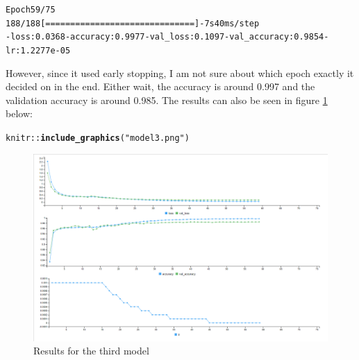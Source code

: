 \documentclass[10pt, a4paper, english]{article}\usepackage[]{graphicx}\usepackage[dvipsnames]{xcolor}
\makeatletter
\def\maxwidth{ %
  \ifdim\Gin@nat@width>\linewidth
    \linewidth
  \else
    \Gin@nat@width
  \fi
}
\newcommand{\hlstr}[1]{\textcolor[rgb]{0.192,0.494,0.8}{#1}}%
\newcommand{\hlopt}[1]{\textcolor[rgb]{0,0,0}{#1}}%
\newcommand{\hlstd}[1]{\textcolor[rgb]{0.345,0.345,0.345}{#1}}%
\newcommand{\hlkwd}[1]{\textcolor[rgb]{0.737,0.353,0.396}{\textbf{#1}}}%
\newenvironment{kframe}{%
 \def\at@end@of@kframe{}%
 \ifinner\ifhmode%
  \def\at@end@of@kframe{\end{minipage}}%
  \begin{minipage}{\columnwidth}%
 \fi\fi%
 \def\FrameCommand##1{\hskip\@totalleftmargin \hskip-\fboxsep
 \colorbox{shadecolor}{##1}\hskip-\fboxsep
     \hskip-\linewidth \hskip-\@totalleftmargin \hskip\columnwidth}%
 \MakeFramed {\advance\hsize-\width
   \@totalleftmargin\z@ \linewidth\hsize
   \@setminipage}}%
 {\par\unskip\endMakeFramed%
 \at@end@of@kframe}
\newenvironment{knitrout}{}{} %
\makeatother
\begin{document}
\begin{knitrout}
\color{fgcolor}\begin{kframe}
\begin{alltt}
Epoch 59/75
188/188 [==============================] - 7s 40ms/step 
- loss: 0.0368 - accuracy: 0.9977 - val_loss: 0.1097 - val_accuracy: 0.9854 - lr: 1.2277e-05
\end{alltt}
\end{kframe}
\end{knitrout}
However, since it used early stopping, I am not sure about which epoch exactly it decided on in the end. Either wait, the accuracy is around 0.997 and the validation accuracy is around 0.985. The results can also be seen in figure \ref{fig:model3} below:
\begin{knitrout}
\color{fgcolor}\begin{kframe}
\begin{alltt}
\hlstd{knitr}\hlopt{::}\hlkwd{include_graphics}\hlstd{(}\hlstr{"model3.png"}\hlstd{)}
\end{alltt}
\end{kframe}\begin{figure}
\includegraphics[width=\maxwidth]{model3} \caption[Results for the third model]{Results for the third model}\label{fig:model3}
\end{figure}

\end{knitrout}
\end{document}

